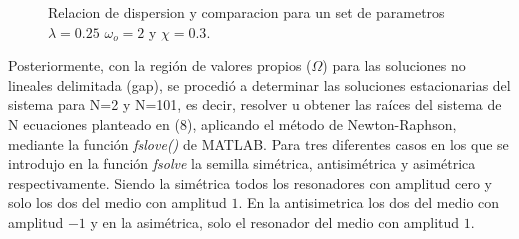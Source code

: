 \documentclass[11pt,letterpaper,twocolumn]{article}
\begin{document}
\begin{figure}[h!]
\centering
{}
\caption{Relacion de dispersion y comparacion para un set de parametros $\lambda=0.25$ $\omega_{o}=2$ y $\chi=0.3$.}
\end{figure}
\par 
Posteriormente, con la región de valores propios ($\Omega$) para las soluciones no lineales delimitada (gap), se procedió a determinar las soluciones estacionarias del sistema para N=2 y N=101, es decir, resolver u obtener las raíces del sistema de N ecuaciones planteado en ($8$), aplicando el método de Newton-Raphson, mediante la función \textit{fslove()} de MATLAB. Para tres diferentes casos en los que se introdujo en la función \textit{fsolve} la semilla simétrica, antisimétrica y asimétrica respectivamente. Siendo la simétrica todos los resonadores con amplitud cero y solo los dos del medio con amplitud $1$. En la antisimetrica los dos del medio con amplitud $-1$ y en la asimétrica, solo el resonador del medio con amplitud $1$.\\
\end{document}
